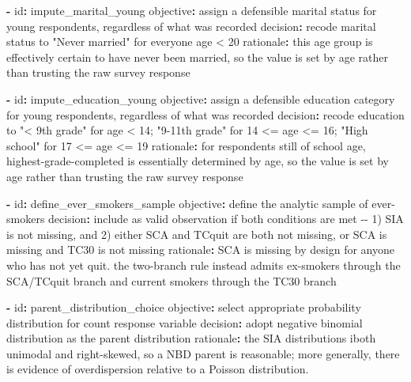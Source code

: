 \documentclass[aoas]{imsart}
\makeatletter
\newenvironment{Shaded}{\begin{snugshade}}{\end{snugshade}}
\newcommand{\AttributeTok}[1]{\textcolor[rgb]{0.40,0.45,0.13}{#1}}
\newcommand{\FunctionTok}[1]{\textcolor[rgb]{0.28,0.35,0.67}{#1}}
\newcommand{\KeywordTok}[1]{\textcolor[rgb]{0.00,0.23,0.31}{\textbf{#1}}}
\renewenvironment{Shaded}{}{}
\renewenvironment{codelisting}{%
    \def\@captype{codelisting}%
    \par\addvspace{0.5em}\noindent
  }{%
    \par\addvspace{0.5em}%
  }%
\makeatother
\begin{document}
\begin{codelisting}
{\begin{Shaded}
\begin{Highlighting}[]
\KeywordTok{{-}}\AttributeTok{ }\FunctionTok{id}\KeywordTok{:}\AttributeTok{ impute\_marital\_young}
\AttributeTok{  }\FunctionTok{objective}\KeywordTok{:}\AttributeTok{ assign a defensible marital status for young respondents, regardless of what was recorded}
\AttributeTok{  }\FunctionTok{decision}\KeywordTok{:}\AttributeTok{ recode marital status to "Never married" for everyone age \textless{} 20}
\AttributeTok{  }\FunctionTok{rationale}\KeywordTok{:}\AttributeTok{ this age group is effectively certain to have never been married, so the value is set by age rather than trusting the raw survey response}

\KeywordTok{{-}}\AttributeTok{ }\FunctionTok{id}\KeywordTok{:}\AttributeTok{ impute\_education\_young}
\AttributeTok{  }\FunctionTok{objective}\KeywordTok{:}\AttributeTok{ assign a defensible education category for young respondents, regardless of what was recorded}
\AttributeTok{  }\FunctionTok{decision}\KeywordTok{:}\AttributeTok{ recode education to "\textless{} 9th grade" for age \textless{} 14; "9{-}11th grade" for 14 \textless{}= age \textless{}= 16; "High school" for 17 \textless{}= age \textless{}= 19}
\AttributeTok{  }\FunctionTok{rationale}\KeywordTok{:}\AttributeTok{ for respondents still of school age, highest{-}grade{-}completed is essentially determined by age, so the value is set by age rather than trusting the raw survey response}

\KeywordTok{{-}}\AttributeTok{ }\FunctionTok{id}\KeywordTok{:}\AttributeTok{ define\_ever\_smokers\_sample}
\AttributeTok{  }\FunctionTok{objective}\KeywordTok{:}\AttributeTok{ define the analytic sample of ever{-}smokers}
\AttributeTok{  }\FunctionTok{decision}\KeywordTok{:}\AttributeTok{ include as valid observation if both conditions are met {-}{-} 1) SIA is not missing, and 2) either SCA and TCquit are both not missing, or SCA is missing and TC30 is not missing}
\AttributeTok{  }\FunctionTok{rationale}\KeywordTok{:}\AttributeTok{ SCA is missing by design for anyone who has not yet quit. the two{-}branch rule instead admits ex{-}smokers through the SCA/TCquit branch and current smokers through the TC30 branch}

\KeywordTok{{-}}\AttributeTok{ }\FunctionTok{id}\KeywordTok{:}\AttributeTok{ parent\_distribution\_choice}
\AttributeTok{  }\FunctionTok{objective}\KeywordTok{:}\AttributeTok{ select appropriate probability distribution for count response variable}
\AttributeTok{  }\FunctionTok{decision}\KeywordTok{:}\AttributeTok{ adopt negative binomial distribution as the parent distribution}
\AttributeTok{  }\FunctionTok{rationale}\KeywordTok{:}\AttributeTok{ the SIA distributions iboth unimodal and right{-}skewed, so a NBD parent is reasonable; more generally, there is evidence of overdispersion relative to a Poisson distribution.}


\end{Highlighting}
\end{Shaded}}
\end{codelisting}
\end{document}
